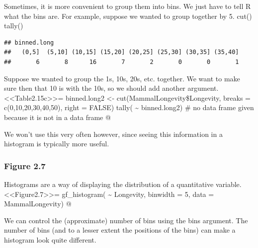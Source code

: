 \documentclass[]{book}
\newenvironment{Shaded}{\begin{snugshade}}{\end{snugshade}}
\newcommand{\CommentTok}[1]{\textcolor[rgb]{0.56,0.35,0.01}{\textit{#1}}}
\newcommand{\DataTypeTok}[1]{\textcolor[rgb]{0.13,0.29,0.53}{#1}}
\newcommand{\DecValTok}[1]{\textcolor[rgb]{0.00,0.00,0.81}{#1}}
\newcommand{\KeywordTok}[1]{\textcolor[rgb]{0.13,0.29,0.53}{\textbf{#1}}}
\newcommand{\NormalTok}[1]{#1}
\newcommand{\OperatorTok}[1]{\textcolor[rgb]{0.81,0.36,0.00}{\textbf{#1}}}
\newcommand{\StringTok}[1]{\textcolor[rgb]{0.31,0.60,0.02}{#1}}
\begin{document}
Sometimes, it is more convenient to group them into bins. We just have to tell R what the bins are. For example, suppose we wanted to group together by 5.
cut()
tally()

\begin{Shaded}
\end{Shaded}

\begin{verbatim}
## binned.long
##   (0,5]  (5,10] (10,15] (15,20] (20,25] (25,30] (30,35] (35,40] 
##       6       8      16       7       2       0       0       1
\end{verbatim}

Suppose we wanted to group the 1s, 10s, 20s, etc. together. We want to make sure then that 10 is with the 10s, so we should add another argument.
\textless\textless Table2.15c\textgreater\textgreater=
binned.long2 \textless- cut(MammalLongevity\$Longevity, breaks = c(0,10,20,30,40,50), right = FALSE)
tally( \textasciitilde{} binned.long2) \# no data frame given because it is not in a data frame
@

We won't use this very often however, since seeing this information in a histogram is typically more useful.

\hypertarget{figure-2.7}{%
\subsubsection{Figure 2.7}\label{figure-2.7}}

Histograms are a way of displaying the distribution of a quantitative variable.
\textless\textless Figure2.7\textgreater\textgreater=
gf\_histogram( \textasciitilde{} Longevity, binwidth = 5, data = MammalLongevity)
@

We can control the (approximate) number of bins using the {bins} argument. The number of bins (and to a lesser extent the positions of the bins) can make a histogram look quite different.
\end{document}
